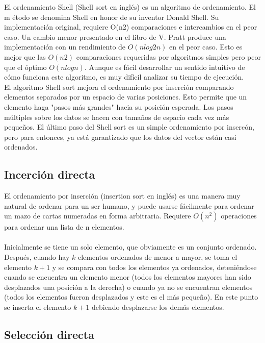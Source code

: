 \documentclass{article}
\begin{document}
El ordenamiento Shell (Shell sort en ingl\'es) es un algoritmo de ordenamiento. El m
\'etodo se denomina Shell en honor de su inventor Donald Shell. Su implementaci\'on original,
requiere O(n2) comparaciones e intercambios en el peor caso. Un cambio menor presentado en
el libro de V. Pratt produce una implementaci\'on con un rendimiento de $O(n log2 n)$ en
el peor caso. Esto es mejor que las $O(n2)$ comparaciones requeridas por algoritmos
simples pero peor que el \'optimo $O(n log n)$. Aunque es f\'acil desarrollar un sentido
intuitivo de c\'omo funciona este algoritmo, es muy dif\'icil analizar su tiempo de
ejecuci\'on.\\
 \clearpage
El algoritmo Shell sort mejora el ordenamiento por inserci\'on comparando elementos
separados por un espacio de varias posiciones. Esto permite que un elemento haga "pasos
m\'as grandes" hacia su posici\'on esperada. Los pasos m\'ultiples sobre los datos se
hacen con tama\~{n}os de espacio cada vez más peque\~{n}os. El \'ultimo paso del Shell
sort es un simple ordenamiento por inserc\'on, pero para entonces, ya est\'a garantizado
que los datos del vector están casi ordenados. \\

\subsection*{Incerci\'on directa}

El ordenamiento por inserci\'on (insertion sort en ingl\'es) es una manera muy natural de
ordenar para un ser humano, y puede usarse f\'acilmente para ordenar un mazo de cartas
numeradas en forma arbitraria. Requiere $O(n^2)$ operaciones para ordenar una lista de n
elementos.\\
\\
Inicialmente se tiene un solo elemento, que obviamente es un conjunto ordenado. Despu\'es,
cuando hay $k$ elementos ordenados de menor a mayor, se toma el elemento $k+1$ y se
compara con todos los elementos ya ordenados, deteni\'endose cuando se encuentra un
elemento menor (todos los elementos mayores han sido desplazados una posici\'on a la
derecha) o cuando ya no se encuentran elementos (todos los elementos fueron desplazados y
este es el m\'as peque\~{n}o). En este punto se inserta el elemento $k+1$ debiendo
desplazarse los dem\'as elementos.

\subsection*{Selecci\'on directa}
\end{document}
